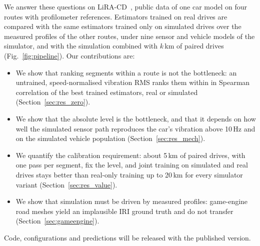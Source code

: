 We answer these questions on LiRA-CD~\cite{skar2023lira}, public data of one car model on four routes with profilometer references.
Estimators trained on real drives are compared with the same estimators trained only on simulated drives over the measured profiles of the other routes, under nine sensor and vehicle models of the simulator, and with the simulation combined with $k$\,km of paired drives (Fig.~\ref{fig:pipeline}).
Our contributions are:
\begin{itemize}
\item We show that ranking segments within a route is not the bottleneck: an untrained, speed-normalised vibration RMS ranks them within \rpAbsMax{} in Spearman correlation of the best trained estimators, real or simulated (Section~\ref{sec:res_zero}).
\item We show that the absolute level is the bottleneck, and that it depends on how well the simulated sensor path reproduces the car's vibration above 10\,Hz and on the simulated vehicle population (Section~\ref{sec:res_mech}).
\item We quantify the calibration requirement: about 5\,km of paired drives, with one pass per segment, fix the level, and joint training on simulated and real drives stays better than real-only training up to 20\,km for every simulator variant (Section~\ref{sec:res_value}).
\item We show that simulation must be driven by measured profiles: game-engine road meshes yield an implausible IRI ground truth and do not transfer (Section~\ref{sec:gameengine}).
\end{itemize}
Code, configurations and predictions will be released with the published version.
